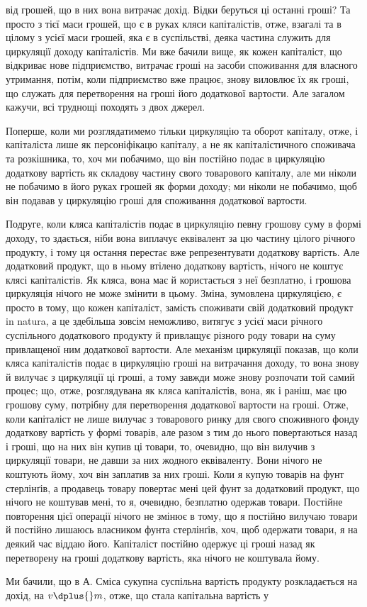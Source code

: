 \parcont{}  %
від грошей, що в них вона витрачає дохід. Відки беруться ці останні
гроші? Та просто з тієї маси грошей, що є в руках кляси капіталістів,
отже, взагалі та в цілому з усієї маси грошей, яка є в суспільстві,
деяка частина служить для циркуляції доходу капіталістів. Ми
вже бачили вище, як кожен капіталіст, що відкриває нове підприємство,
витрачає гроші на засоби споживання для власного утримання, потім,
коли підприємство вже працює, знову виловлює їх як гроші, що служать
для перетворення на гроші його додаткової вартости. Але загалом кажучи,
всі труднощі походять з двох джерел.

Поперше, коли ми розглядатимемо тільки циркуляцію та оборот капіталу,
отже, і капіталіста лише як персоніфікацю капіталу, а не як капіталістичного
споживача та розкішника, то, хоч ми побачимо, що він
постійно подає в циркуляцію додаткову вартість як складову частину
свого товарового капіталу, але ми ніколи не побачимо в його руках грошей
як форми доходу; ми ніколи не побачимо, щоб він подавав у циркуляцію
гроші для споживання додаткової вартости.

Подруге, коли кляса капіталістів подає в циркуляцію певну грошову
суму в формі доходу, то здається, ніби вона виплачує еквівалент за цю
частину цілого річного продукту, і тому ця остання перестає вже репрезентувати
додаткову вартість. Але додатковий продукт, що в ньому
втілено додаткову вартість, нічого не коштує клясі капіталістів. Як кляса,
вона має й користається з неї безплатно, і грошова циркуляція нічого
не може змінити в цьому. Зміна, зумовлена циркуляцією, є просто в тому,
що кожен капіталіст, замість споживати свій додатковий продукт in natura,
а це здебільша зовсім неможливо, витягує з усієї маси річного суспільного
додаткового продукту й привлащує різного роду товари на суму
привлащеної ним додаткової вартости. Але механізм циркуляції показав,
що коли кляса капіталістів подає в циркуляцію гроші на витрачання
доходу, то вона знову й вилучає з циркуляції ці гроші, а тому завжди
може знову розпочати той самий процес; що, отже, розглядувана як
кляса капіталістів, вона, як і раніш, має цю грошову суму, потрібну для
перетворення додаткової вартости на гроші. Отже, коли капіталіст не
лише вилучає з товарового ринку для свого споживного фонду додаткову
вартість у формі товарів, але разом з тим до нього повертаються назад
і гроші, що на них він купив ці товари, то, очевидно, що він вилучив
з циркуляції товари, не давши за них жодного еквіваленту. Вони нічого
не коштують йому, хоч він заплатив за них гроші. Коли я купую товарів
на фунт стерлінґів, а продавець товару повертає мені цей фунт за додатковий
продукт, що нічого не коштував мені, то я, очевидно, безплатно
одержав товари. Постійне повторення цієї операції нічого не змінює в
тому, що я постійно вилучаю товари й постійно лишаюсь власником
фунта стерлінґів, хоч, щоб одержати товари, я на деякий час віддаю
його. Капіталіст постійно одержує ці гроші назад як перетворену на
гроші додаткову вартість, яка нічого не коштувала йому.

Ми бачили, що в А. Сміса сукупна суспільна вартість продукту розкладається
на дохід, на $v \dplus{} m$, отже, що стала капітальна вартість у
\parbreak{}  %
